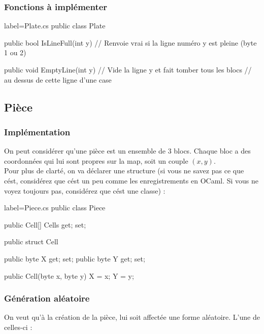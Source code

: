 \documentclass[a4paper]{article}
\begin{document}
\subsubsection{Fonctions à implémenter}

\begin{csharpcode*}{label=Plate.cs}
public class Plate
{
    public bool IsLineFull(int y)
    {
        // Renvoie vrai si la ligne numéro y est pleine (byte 1 ou 2)
    }
    
    public void EmptyLine(int y)
    {
        // Vide la ligne y et fait tomber tous les blocs
        // au dessus de cette ligne d'une case
    }
}
\end{csharpcode*}

\subsection{Pièce}

\subsubsection{Implémentation}

On peut considérer qu'une pièce est un ensemble de 3 blocs. Chaque bloc a des
coordonnées qui lui sont propres sur la map, soit un couple $(x,y)$. \\

Pour plus de clarté, on va déclarer une structure (si vous ne savez pas ce que
cést, considérez que cést un peu comme les enregistrements en OCaml. Si vous
ne voyez toujours pas, considérez que cést une classe) : \\

\begin{csharpcode*}{label=Piece.cs}
public class Piece
{
    public Cell[] Cells { get; set; }

    public struct Cell
    {
        public byte X { get; set; }
        public byte Y { get; set; }

        public Cell(byte x, byte y)
        {
            X = x;
            Y = y;
        }
    }
}
\end{csharpcode*}

\subsubsection{Génération aléatoire}
\begingroup
    On veut qu'à la création de la pièce, lui soit affectée une forme aléatoire.
    L'une de celles-ci : \\
\end{document}
